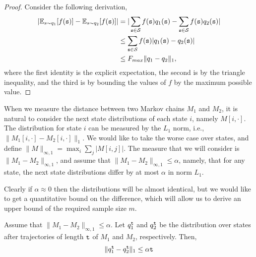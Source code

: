 \begin{proof} Consider the following derivation,
\begin{align*} |\mathbb{E}_{s\sim q_1}[f({\tt s})]- \mathbb{E}_{s\sim q_2}[f({\tt s})]|
&=|\sum_{{\tt s} \in \mathcal{S}} f({\tt s})q_1({\tt s}) - \sum_{{\tt s} \in \mathcal{S}} f({\tt s})q_2({\tt s})| \\
&\leq \sum_{{\tt s} \in \mathcal{S}} f({\tt s})|q_1({\tt s}) - q_2({\tt s})|\\
 &\leq F_{max} \|q_1-q_2\|_1,
\end{align*}
where the first identity is the explicit expectation, the second is by the triangle inequality, and the third is by bounding the values of $f$ by the maximum possible value.
\end{proof}

When we measure the distance between two Markov chains $M_1$ and
$M_2$, it is natural to consider the next state distributions of
each state $i$, namely $M[i,\cdot]$. The distribution for state $i$
can be measured by the $L_1$ norm, i.e., $\|
M_1[i,\cdot]-M_2[i,\cdot]\|_1 $. We would like to take the worse
case over states, and define $\|M\|_{\infty,1} = \max_i \sum_j
|M[i,j]|$. The measure that we will consider is
$\|M_1-M_2\|_{\infty,1}$, and assume that
$\|M_1-M_2\|_{\infty,1}\leq \alpha$, namely, that for any state, the
next state distributions differ by at most $\alpha$ in norm $L_1$.



Clearly if $\alpha\approx 0$ then the distributions will be almost
identical, but we would like to get a quantitative bound on the
difference, which will allow us to derive an upper bound of the
required sample size $m$.



\begin{theorem}
\label{thm:l1-error}
%
Assume that $\|M_1-M_2\|_{\infty,1}\leq \alpha$.
%
Let $q_1^{\tt t}$ and $q_2^{\tt t}$ be the distribution over states
after trajectories  of length ${\tt t}$ of $M_1$ and $M_2$,
respectively. Then,
\[
\|q_1^{\tt t}-q_2^{\tt t}\|_1\leq \alpha  {\tt t}
\]
\end{theorem}

